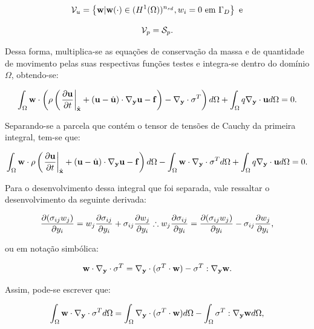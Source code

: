 \documentclass[_ArquivoPrincipal.tex]{subfiles}
\begin{document}
\begin{equation}
    \mathcal{V}_u=\left\{\mathbf{w}|\mathbf{w}(\cdot)\in(H^1(\Omega))^{n_{sd}},w_i=0\text{ em }\Gamma_D\right\}\text{ e}
\end{equation}

\begin{equation}
    \mathcal{V}_p=\mathcal{S}_p\text{.}
\end{equation}

Dessa forma, multiplica-se as equações de conservação da massa e de quantidade de movimento pelas suas respectivas funções testes e integra-se dentro do domínio $\Omega$, obtendo-se:

\begin{equation}
    \int_\Omega{\mathbf{w}\cdot\left(\rho\left(\left.\frac{\partial{\mathbf{u}}}{\partial{t}}\right|_{\hat{\mathbf{x}}}+(\mathbf{u}-\hat{\mathbf{u}})\cdot\mathbf{\nabla_y}\mathbf{u}-\mathbf{f}\right)-\mathbf{\nabla_y}\cdot\mathbf{\sigma}^T\right)d\Omega}+\int_\Omega{q\mathbf{\nabla_y}\cdot\mathbf{u}d\Omega}=0\text{.}
\end{equation}

Separando-se a parcela que contém o tensor de tensões de Cauchy da primeira integral, tem-se que:

\begin{equation}
    \int_\Omega{\mathbf{w}\cdot\rho\left(\left.\frac{\partial{\mathbf{u}}}{\partial{t}}\right|_{\hat{\mathbf{x}}}+(\mathbf{u}-\hat{\mathbf{u}})\cdot\mathbf{\nabla_y}\mathbf{u}-\mathbf{f}\right)d\Omega}-\int_\Omega{\mathbf{w}\cdot\mathbf{\nabla_y}\cdot\mathbf{\sigma}^Td\Omega}+\int_\Omega{q\mathbf{\nabla_y}\cdot\mathbf{u}d\Omega}=0\text{.}
    \label{eq:WeakForm1}
\end{equation}

Para o desenvolvimento dessa integral que foi separada, vale ressaltar o desenvolvimento da seguinte derivada:

\[
\frac{\partial{(\sigma_{ij}w_j)}}{\partial{y_i}}=w_j\frac{\partial{\sigma_{ij}}}{\partial{y_i}}+\sigma_{ij}\frac{\partial{w_j}}{\partial{y_i}}\therefore w_j\frac{\partial{\sigma_{ij}}}{\partial{y_i}}=\frac{\partial{(\sigma_{ij}w_j)}}{\partial{y_i}}-\sigma_{ij}\frac{\partial{w_j}}{\partial{y_i}}\text{,}
\]

\noindent ou em notação simbólica:

\begin{equation}
    \mathbf{w}\cdot\mathbf{\nabla_y}\cdot\mathbf{\sigma}^T=\mathbf{\nabla_y}\cdot(\mathbf{\sigma}^T\cdot\mathbf{w})-\mathbf{\sigma}^T:\mathbf{\nabla_y}\mathbf{w}\text{.}
\end{equation}

Assim, pode-se escrever que:

\begin{equation}
     \int_\Omega{\mathbf{w}\cdot\mathbf{\nabla_y}\cdot\mathbf{\sigma}^Td\Omega}=
     \int_\Omega{\mathbf{\nabla_y}\cdot(\mathbf{\sigma}^T\cdot\mathbf{w})d\Omega}-\int_\Omega{\mathbf{\sigma}^T:\mathbf{\nabla_y}\mathbf{w}d\Omega}\text{,}
\end{equation}
\end{document}
